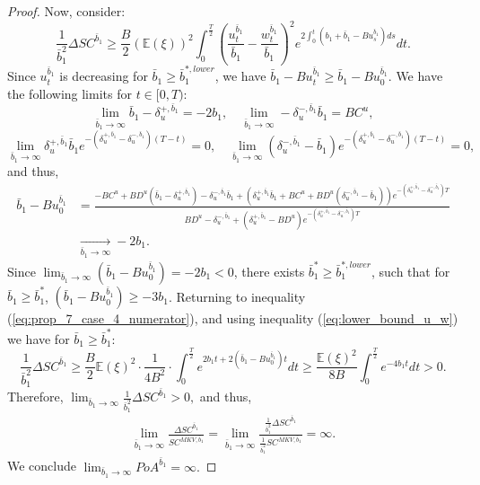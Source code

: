\documentclass[11pt]{article}
\begin{document}
\begin{proof}
	Now, consider:
	\begin{equation}
	\frac{1}{\bar{b}_1^2}\Delta SC^{\bar{b}_1}\geq \frac{B}{2}(\mathbb{E}(\xi))^2\int_{0}^{\frac{T}{2}} \left(\frac{u_t^{\bar{b}_1}}{\bar{b}_1} - \frac{w_t^{\bar{b}_1}}{\bar{b}_1}\right)^2 e^{2\int_0^t (b_1+\bar{b}_1-B u_s^{\bar{b}_1})ds} dt.
	\label{eq:prop_7_case_4_numerator}
	\end{equation}
	Since $u^{\bar{b}_1}_t$ is decreasing for $\bar{b}_1 \geq \bar{b}_1^{*,lower}$, we have $\bar{b}_1-B u_t^{\bar{b}_1} \geq \bar{b}_1-B u_0^{\bar{b}_1}$. We have the following limits for $t\in[0,T)$:
	\begin{equation*}
	\lim_{\bar{b}_1 \to \infty}\bar{b}_1-\delta^{+,\bar{b}_1}_u=-2b_1, \quad \lim_{\bar{b}_1 \to \infty}-\delta^{-,\bar{b}_1}_u\bar{b}_1=BC^u,
	\end{equation*}
	\begin{equation*}
	\lim_{\bar{b}_1 \to \infty}\delta^{+,\bar{b}_1}_u\bar{b}_1e^{-(\delta^{+,\bar{b}_1}_u-\delta^{-,\bar{b}_1}_u)(T-t)}=0, \quad \lim_{\bar{b}_1 \to \infty}(\delta^{-,\bar{b}_1}_u-\bar{b}_1)e^{-(\delta^{+,\bar{b}_1}_u-\delta^{-,\bar{b}_1}_u)(T-t)}=0,
	\end{equation*}
	and thus,
	\begin{equation*}
	\begin{split}
	\bar{b}_1-Bu^{\bar{b}_1}_0&=\frac{-BC^u+BD^u(\bar{b}_1-\delta^{+,\bar{b}_1}_u)-\delta^{-,\bar{b}_1}_u\bar{b}_1+(\delta^{+,\bar{b}_1}_u\bar{b}_1+BC^u+BD^u(\delta^{-,\bar{b}_1}_u-\bar{b}_1))e^{-(\delta^{+,\bar{b}_1}_u-\delta^{-,\bar{b}_1}_u)T}}{BD^u-\delta^{-,\bar{b}_1}_u+(\delta^{+,\bar{b}_1}_u-BD^u) e^{-(\delta^{+,\bar{b}_1}_u-\delta^{-,\bar{b}_1}_u)T}} \\
	&\xrightarrow[\bar{b}_1 \to \infty]{} -2b_1 .
	\end{split}
	\end{equation*}
	Since $\lim_{\bar{b}_1 \to \infty}(\bar{b}_1-B u_0^{\bar{b}_1}) = -2b_1 < 0$, there exists $\bar{b}_1^{*}\geq\bar{b}_1^{*,lower}$, such that for $\bar{b}_1 \geq \bar{b}_1^{*}$, $(\bar{b}_1-B u_0^{\bar{b}_1}) \geq -3b_1$. Returning to inequality (\ref{eq:prop_7_case_4_numerator}), and using inequality (\ref{eq:lower_bound_u_w}) we have for $\bar{b}_1 \geq \bar{b}^*_1$:
	\begin{equation*}
	\frac{1}{\bar{b}_1^2}\Delta SC^{\bar{b}_1}
	\geq \frac{B}{2}\mathbb{E}(\xi)^2 \cdot \frac{1}{4B^2} \cdot \int_{0}^{\frac{T}{2}} e^{2b_1 t + 2(\bar{b}_1 - B u_0^{\bar{b}_1}) t } dt \geq \frac{\mathbb{E}(\xi)^2}{8 B} \int_0^{\frac{T}{2}} e^{-4b_1 t} dt  > 0.
	\end{equation*}
	Therefore,
	$
	\lim_{\bar{b}_1 \to \infty}\frac{1}{\bar{b}_1^2}\Delta SC^{\bar{b}_1}>0,
	$
	and thus,
	\begin{equation*}
	\begin{split}
	\lim_{\bar{b}_1 \to \infty}\frac{\Delta SC^{\bar{b}_1}}{SC^{MKV,\bar{b}_1}}=\lim_{\bar{b}_1 \to \infty}\frac{\frac{1}{\bar{b}_1^2}\Delta SC^{\bar{b}_1}}{\frac{1}{\bar{b}_1^2}SC^{MKV,\bar{b}_1}}=\infty.
	\end{split}
	\end{equation*}
	We conclude
	$
	\lim_{\bar{b}_1 \to \infty} PoA^{\bar{b}_1}=\infty.
	$
	

\end{proof}
\end{document}
